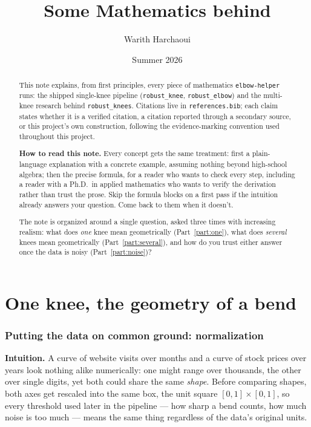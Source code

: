 \documentclass[11pt]{article}
\title{Some Mathematics behind \code{elbow-helper}}
\author{Warith Harchaoui}
\date{Summer 2026}
\newcommand{\code}[1]{\texttt{#1}}
\begin{document}
\maketitle

\begin{abstract}
This note explains, from first principles, every piece of mathematics
\code{elbow-helper} runs: the shipped single-knee pipeline
(\code{robust\_knee}, \code{robust\_elbow}) and the multi-knee research
behind \code{robust\_knees}. Citations live in \code{references.bib}; each
claim states whether it is a verified citation, a citation reported through
a secondary source, or this project's own construction, following the
evidence-marking convention used throughout this project.

\textbf{How to read this note.} Every concept gets the same treatment: first
a plain-language explanation with a concrete example, assuming nothing
beyond high-school algebra; then the precise formula, for a reader who wants
to check every step, including a reader with a Ph.D.\ in applied mathematics
who wants to verify the derivation rather than trust the prose. Skip the
formula blocks on a first pass if the intuition already answers your
question. Come back to them when it doesn't.

The note is organized around a single question, asked three times with
increasing realism: what does \emph{one} knee mean geometrically
(Part~\ref{part:one}), what does \emph{several} knees mean geometrically
(Part~\ref{part:several}), and how do you trust either answer once the data
is noisy (Part~\ref{part:noise})?
\end{abstract}

\clearpage

\tableofcontents

\clearpage


\part{One knee, the geometry of a bend}
\label{part:one}

\section{Putting the data on common ground: normalization}

\textbf{Intuition.} A curve of website visits over months and a curve of
stock prices over years look nothing alike numerically: one might range over
thousands, the other over single digits, yet both could share the same
\emph{shape}. Before comparing shapes, both axes get rescaled into the same
box, the unit square $[0,1] \times [0,1]$, so every threshold used later in
the pipeline --- how sharp a bend counts, how much noise is too much ---
means the same thing regardless of the data's original units.
\end{document}
